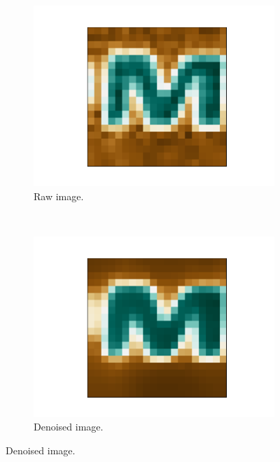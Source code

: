 \documentclass[../main.tex]{subfiles}
\begin{document}
\begin{figure}
    \centering
    \begin{subfigure}[t]{0.2\textwidth}
        \includegraphics[width=\textwidth]{figures/pp/raw.pdf}
        \caption{Raw image.}
        \label{fig:gull}
    \end{subfigure}
    ~ %
    \begin{subfigure}[t]{0.2\textwidth}
        \includegraphics[width=\textwidth]{figures/pp/denoise.pdf}
        \caption{Denoised image.}
        \label{fig:denoise}
    \end{subfigure}

\end{figure}
\end{document}
